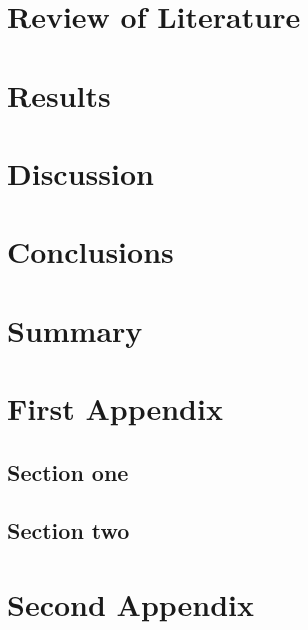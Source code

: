 \documentclass[doublespace,draft,nopageskip]{VTthesis} %
\begin{document}
    \chapter{Review of Literature} \label{ch:lit_review}
	\chapter{Results} \label{ch:results}
	\chapter{Discussion} \label{ch:discussion}
	\chapter{Conclusions} \label{ch:conclusions}
	\chapter{Summary} \label{ch:summary}


	\appendix

	\begin{appendices}
		\chapter{First Appendix} \label{app:appendix_one}
			\section{Section one} \label{ase:app_one_sect_1}
				\lipsum[1-3]
			\section{Section two} \label{ase:app_one_sect_2}
				\lipsum[1-3]
		\chapter{Second Appendix} \label{app:appendix_two}
			\lipsum[2]
	\end{appendices}
\end{document}
